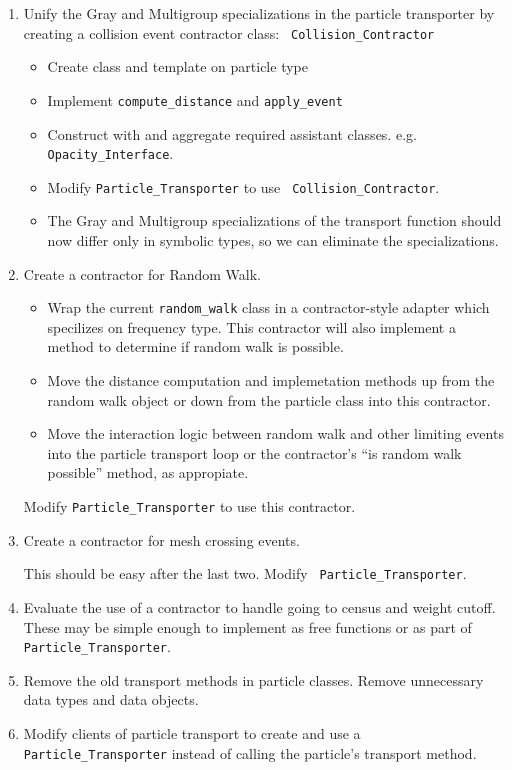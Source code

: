 \documentclass[memo]{ResearchNote}
\begin{document}
\begin{enumerate}
\item Unify the Gray and Multigroup specializations in the particle
  transporter by creating a collision event contractor class: {\tt
    Collision\_Contractor}

  \begin{itemize}
    \item Create class and template on particle type
    \item Implement {\tt compute\_distance} and {\tt apply\_event}
    \item Construct with and aggregate required assistant classes.
      e.g.  {\tt Opacity\_Interface}.
    \item Modify {\tt Particle\_Transporter} to use {\tt
        Collision\_Contractor}.
    \item The Gray and Multigroup specializations of the transport
      function should now differ only in symbolic types, so we can
      eliminate the specializations.
    \end{itemize}
    
  \item Create a contractor for Random Walk. 

    \begin{itemize}
    \item Wrap the current {\tt random\_walk} class in a
      contractor-style adapter which specilizes on frequency
      type. This contractor will also implement a method to determine
      if random walk is possible.
    \item Move the distance computation and implemetation methods up
      from the random walk object or down from the particle class into
      this contractor.
    \item Move the interaction logic between random walk and other
      limiting events into the particle transport loop or the
      contractor's ``is random walk possible'' method, as appropiate.
    \end{itemize}

    Modify {\tt Particle\_Transporter} to use this contractor.
    
  \item Create a contractor for mesh crossing events.
    
    This should be easy after the last two. Modify {\tt
      Particle\_Transporter}.

  \item Evaluate the use of a contractor to handle going to census and
    weight cutoff. These may be simple enough to implement as free
    functions or as part of {\tt Particle\_Transporter}.
    
  \item Remove the old transport methods in particle classes. Remove
    unnecessary data types and data objects.
    
  \item Modify clients of particle transport to create and use a {\tt
      Particle\_Transporter} instead of calling the particle's
    transport method.

\end{enumerate}
\end{document}
